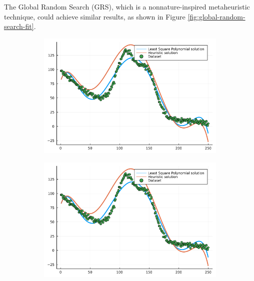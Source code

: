 \documentclass[12pt,a4paper]{article}
\begin{document}
The Global Random Search (GRS), which is a nonnature-inspired metaheuristic technique, could achieve similar results, as shown in Figure \ref{fig:global-random-search-fit}.

\begin{figure}[H]
    \centering
    \begin{subfigure}{0.6\textwidth}
        \includegraphics[width=\linewidth]{../figs/grs_regression_result1.png}
    \end{subfigure}
\end{figure}%
\begin{figure}[H]\ContinuedFloat
    \centering
    \begin{subfigure}{0.6\textwidth}
        \includegraphics[width=\linewidth]{../figs/grs_regression_result2.png}
    \end{subfigure}
\end{figure}    
\end{document}

